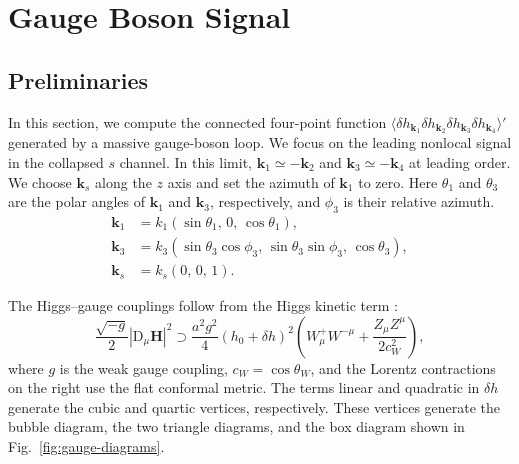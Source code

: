 \documentclass[a4paper,12pt]{article}
\def\mb{\mathbf}
\begin{document}
\section{Gauge Boson Signal}
\label{sec:gauge-boson}

\subsection{Preliminaries}
\label{sec:gauge-preliminaries}
In this section, we compute the connected four-point function $\langle\delta h_{\mb k_1}\delta h_{\mb k_2} \delta h_{\mb k_3}\delta h_{\mb k_4}\rangle'$ generated by a massive gauge-boson loop.
We focus on the leading nonlocal signal in the collapsed $s$ channel.
In this limit, $\mb k_1 \simeq - \mb k_2$ and $\mb k_3 \simeq - \mb k_4$ at leading order.
We choose $\mb k_s$ along the $z$ axis and set the azimuth of $\mb k_1$ to zero.
Here $\theta_1$ and $\theta_3$ are the polar angles of $\mb k_1$ and $\mb k_3$, respectively, and $\phi_3$ is their relative azimuth.
\begin{equation}
    \begin{aligned}
        \mb k_1 &= k_1(\sin\theta_1,\,0,\,\cos\theta_1), \\
        \mb k_3 &= k_3(\sin\theta_3\cos\phi_3,\,\sin\theta_3\sin\phi_3,\,\cos\theta_3), \\
        \mb k_s &= k_s(0,\,0,\,1).
    \end{aligned}
    \label{eq:gauge-momenta-cartesian}
\end{equation}

The Higgs--gauge couplings follow from the Higgs kinetic term \cite{lu_cosmological_2020}:
\begin{equation}
    \frac{\sqrt{-g}}{2}|\mathrm D_\mu\mb H|^2
    \supset\frac{a^2g^2}{4}(h_0+\delta h)^2
    \left(W^+_\mu W^{-\mu}+\frac{Z_\mu Z^\mu}{2c_W^2}\right),
    \label{eq:higgs-gauge-couplings}
\end{equation}
where $g$ is the weak gauge coupling, $c_W=\cos\theta_W$, and the Lorentz contractions on the right use the flat conformal metric.
The terms linear and quadratic in $\delta h$ generate the cubic and quartic vertices, respectively.
These vertices generate the bubble diagram, the two triangle diagrams, and the box diagram shown in Fig.~\ref{fig:gauge-diagrams}.
\end{document}
